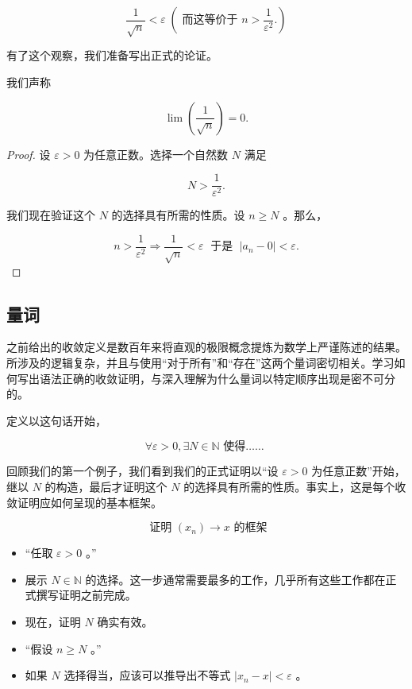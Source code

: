 \begin{Eg}
\[
\frac{1}{\sqrt{n}} < \varepsilon \;(\text{ 而这等价于 }n > \frac{1}{{\varepsilon }^{2}}.)
\]

有了这个观察，我们准备写出正式的论证。

我们声称

\[
\lim \left( \frac{1}{\sqrt{n}}\right)  = 0.
\]

\begin{proof}
设 \(\varepsilon  > 0\) 为任意正数。选择一个自然数 \(N\) 满足

\[
N > \frac{1}{{\varepsilon }^{2}}.
\]

我们现在验证这个 \(N\) 的选择具有所需的性质。设 \(n \geq  N\) 。那么，

\[
n > \frac{1}{{\varepsilon }^{2}}\Rightarrow\frac{1}{\sqrt{n}} < \varepsilon \;\text{ 于是 }\;\left| {{a}_{n} - 0}\right|  < \varepsilon .
\]  
\end{proof}
\end{Eg}

\subsection{量词}

之前给出的收敛定义是数百年来将直观的极限概念提炼为数学上严谨陈述的结果。所涉及的逻辑复杂，并且与使用“对于所有”和“存在”这两个量词密切相关。学习如何写出语法正确的收敛证明，与深入理解为什么量词以特定顺序出现是密不可分的。

定义以这句话开始，

\HRule

\[
\forall\varepsilon >0 , \exists N \in  \mathbb{N}\text{ 使得…… }
\]

\HRule

回顾我们的第一个例子，我们看到我们的正式证明以“设 \(\varepsilon  > 0\) 为任意正数”开始，继以 \(N\) 的构造，最后才证明这个 \(N\) 的选择具有所需的性质。事实上，这是每个收敛证明应如何呈现的基本框架。

\HRule

\[
\text{ 证明 }\left( {x}_{n}\right)  \rightarrow  x\text{ 的框架}
\]

\HRule

\begin{itemize}
\item “任取 \(\varepsilon  > 0\) 。”
\item 展示 \(N \in  \mathbb{N}\) 的选择。这一步通常需要最多的工作，几乎所有这些工作都在正式撰写证明之前完成。
\item 现在，证明 \(N\) 确实有效。
\item “假设 \(n \geq  N\) 。”
\item 如果 \(N\) 选择得当，应该可以推导出不等式 \(\left| {{x}_{n} - x}\right|  < \varepsilon\) 。
\end{itemize}

